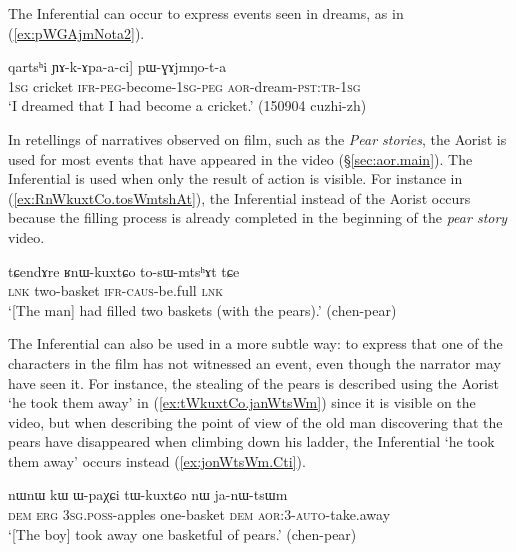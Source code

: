 The Inferential can occur to express events seen in dreams, as in (\ref{ex:pWGAjmNota2}).

\begin{exe}
\ex \label{ex:pWGAjmNota2}
 \gll [aʑo [...] qartsʰi ɲɤ-k-ɤpa-a-ci] pɯ-ɣɤjmŋo-t-a \\
\textsc{1sg} {  } cricket \textsc{ifr}-\textsc{peg}-become-\textsc{1sg}-\textsc{peg} \textsc{aor}-dream-\textsc{pst}:\textsc{tr}-\textsc{1sg} \\
\glt `I dreamed that I had become a cricket.' (150904 cuzhi-zh) 
\end{exe}


In retellings of narratives observed on film, such as the \textit{Pear stories}, the Aorist is used for most events that have appeared in the video (§\ref{sec:aor.main}). The Inferential is used when only the result of action is visible. For instance in (\ref{ex:RnWkuxtCo.tosWmtshAt}), the Inferential  instead of the Aorist  occurs because the filling process is already completed in the beginning of the \textit{pear story} video.

\begin{exe}
\ex \label{ex:RnWkuxtCo.tosWmtshAt}
\gll tɕendɤre ʁnɯ-kuxtɕo to-sɯ-mtsʰɤt tɕe \\
\textsc{lnk} two-basket \textsc{ifr}-\textsc{caus}-be.full \textsc{lnk} \\
\glt `[The man] had filled two baskets (with the pears).' (chen-pear)
 \end{exe}

The Inferential can also be used in a more subtle way: to express that one of the characters in the film has not witnessed an event, even though the narrator may have seen it. For instance, the stealing of the pears is described using the Aorist  `he took them away' in (\ref{ex:tWkuxtCo.janWtsWm}) since it is visible on the video, but when describing the point of view of the old man discovering that the pears have disappeared when climbing down his ladder, the Inferential  `he took them away' occurs instead (\ref{ex:jonWtsWm.Cti}).

\begin{exe}
\ex \label{ex:tWkuxtCo.janWtsWm}
\gll nɯnɯ kɯ ɯ-paχɕi tɯ-kuxtɕo nɯ ja-nɯ-tsɯm \\
\textsc{dem} \textsc{erg} \textsc{3sg}.\textsc{poss}-apples one-basket \textsc{dem} \textsc{aor}:3\flobv{}-\textsc{auto}-take.away \\
\glt `[The boy] took away one basketful of pears.' (chen-pear)
 \end{exe}
 
